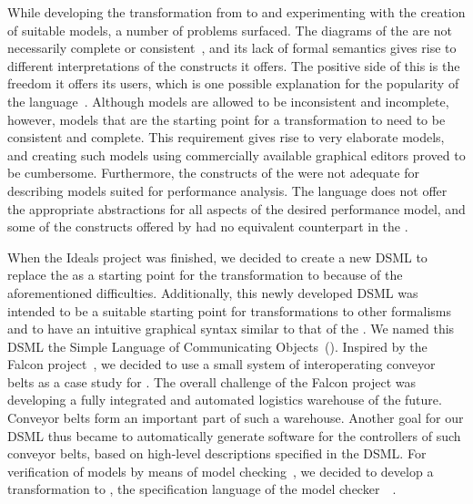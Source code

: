 While developing the transformation from \UML to \POOSL and experimenting with the creation of suitable \UML models, a number of problems surfaced.
The diagrams of the \UML are not necessarily complete or consistent~\cite{Lange04anempirical, Lange03anempirical}, and its lack of formal semantics gives rise to different interpretations of the constructs it offers.
The positive side of this is the freedom it offers its users, which is one possible explanation for the popularity of the language~\cite{Lange06}.
Although \UML models are allowed to be inconsistent and incomplete, however, models that are the starting point for a transformation to \POOSL need to be consistent and complete.
This requirement gives rise to very elaborate \UML models, and creating such models using commercially available graphical editors proved to be cumbersome.
Furthermore, the constructs of the \UML were not adequate for describing models suited for performance analysis.
The language does not offer the appropriate abstractions for all aspects of the desired performance model, and some of the constructs offered by \POOSL had no equivalent counterpart in the \UML.

When the Ideals project was finished, we decided to create a new DSML to replace the \UML as a starting point for the transformation to \POOSL because of the aforementioned difficulties.
Additionally, this newly developed DSML was intended to be a suitable starting point for transformations to other formalisms and to have an intuitive graphical syntax similar to that of the \UML.
We named this DSML the Simple Language of Communicating Objects~(\SLCO).
Inspired by the Falcon project~\cite{Falcon2011}, we decided to use a small system of interoperating conveyor belts as a case study for \SLCO.
The overall challenge of the Falcon project was developing a fully integrated and automated logistics warehouse of the future.
Conveyor belts form an important part of such a warehouse.
Another goal for our DSML thus became to automatically generate software for the controllers of such conveyor belts, based on high-level descriptions specified in the DSML.
For verification of \SLCO models by means of model checking~\cite{Clarke1999}, we decided to develop a transformation to \Promela, the specification language of the model checker~\Spin~\cite{Holzmann2003}.

